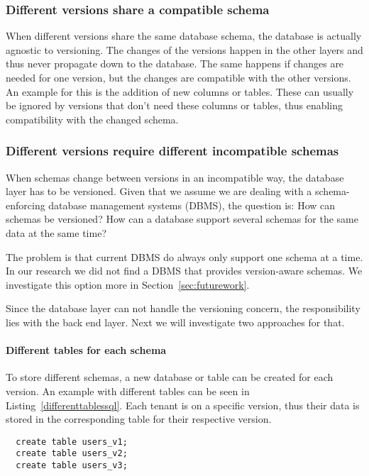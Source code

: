 \subsubsection{Different versions share a compatible schema}

When different versions share the same database schema, the database is actually agnostic to versioning. The changes of the versions happen in the other layers and thus never propagate down to the database. The same happens if changes are needed for one version, but the changes are compatible with the other versions. An example for this is the addition of new columns or tables. These can usually be ignored by versions that don't need these columns or tables, thus enabling compatibility with the changed schema.

\subsubsection{Different versions require different incompatible schemas}

When schemas change between versions in an incompatible way, the database layer has to be versioned. Given that we assume we are dealing with a schema-enforcing database management systems (DBMS), the question is: How can schemas be versioned? How can a database support several schemas for the same data at the same time?

The problem is that current DBMS do always only support one schema at a time. In our research we did not find a DBMS that provides version-aware schemas. We investigate this option more in Section~\ref{sec:futurework}.

Since the database layer can not handle the versioning concern, the responsibility lies with the back end layer. Next we will investigate two approaches for that.

\paragraph{Different tables for each schema}

To store different schemas, a new database or table can be created for each version. An example with different tables can be seen in Listing~\ref{differenttablessql}. Each tenant is on a specific version, thus their data is stored in the corresponding table for their respective version.

\lstset{language=SQL, caption=sql, label=differenttablessql}
\begin{lstlisting}
  create table users_v1;
  create table users_v2;
  create table users_v3;
\end{lstlisting}

